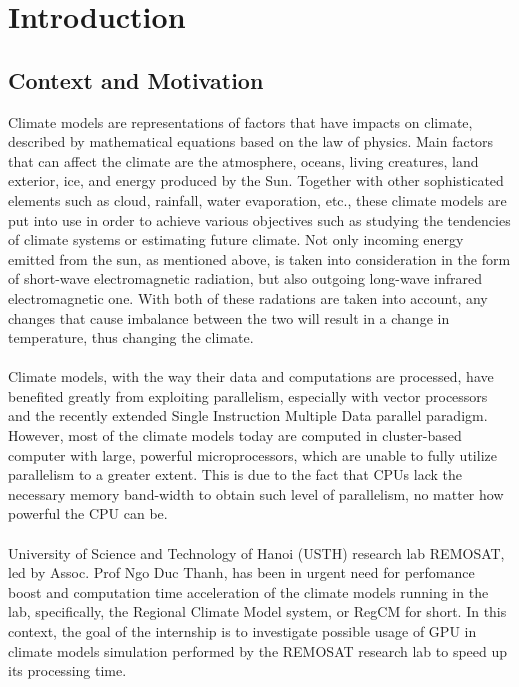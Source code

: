 \chapter{Introduction}

\section{Context and Motivation}

Climate models are representations of factors that have impacts on climate, described by mathematical equations based on the law of physics. Main factors that can affect the climate are the atmosphere, oceans, living creatures, land exterior, ice, and energy produced by the Sun. Together with other sophisticated elements such as cloud, rainfall, water evaporation, etc., these climate models are put into use in order to achieve various objectives such as studying the tendencies of climate systems or estimating future climate. Not only incoming energy emitted from the sun, as mentioned above, is taken into consideration in the form of short-wave electromagnetic radiation, but also outgoing long-wave infrared electromagnetic one. With both of these radations are taken into account, any changes that cause imbalance between the two will result in a change in temperature, thus changing the climate. \\
~\\
Climate models, with the way their data and computations are processed, have benefited greatly from exploiting parallelism, especially with vector processors and the recently extended Single Instruction Multiple Data parallel paradigm. However, most of the climate models today are computed in cluster-based computer with large, powerful microprocessors, which are unable to fully utilize parallelism to a greater extent. This is due to the fact that CPUs lack the necessary memory band-width to obtain such level of parallelism, no matter how powerful the CPU can be.\\
~\\
University of Science and Technology of Hanoi (USTH) research lab REMOSAT, led by Assoc. Prof Ngo Duc Thanh, has been in urgent need for perfomance boost and computation time acceleration of the climate models running in the lab, specifically, the Regional Climate Model system, or RegCM for short. In this context, the goal of the internship is to investigate possible usage of GPU in climate models simulation performed by the REMOSAT research lab to speed up its processing time.\\

